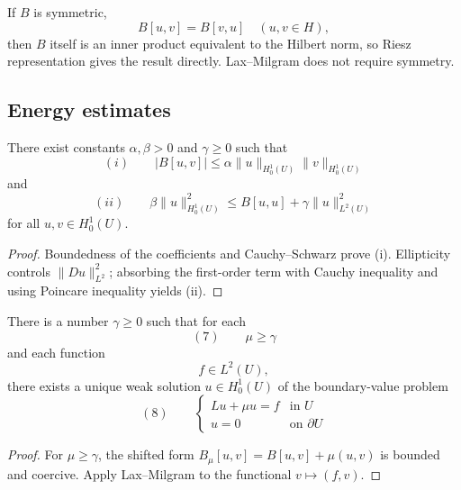 \begin{remark}
\label{rem:lax-milgram-symmetric-case}
If $B$ is symmetric,
$$B[u,v] = B[v,u] \quad (u,v \in H),$$
then $B$ itself is an inner product equivalent to the Hilbert norm, so Riesz representation gives the result directly. Lax--Milgram does not require symmetry.
\end{remark}

\subsection{Energy estimates}

\begin{theorem}
\label{thm:energy-estimates}
There exist constants $\alpha,\beta > 0$ and $\gamma \geq 0$ such that
$$(i) \qquad |B[u,v]| \leq \alpha\|u\|_{H_0^1(U)}\|v\|_{H_0^1(U)}$$
and
$$(ii) \qquad \beta\|u\|_{H_0^1(U)}^2 \leq B[u,u] + \gamma\|u\|_{L^2(U)}^2$$
for all $u,v \in H_0^1(U)$.
\end{theorem}

\begin{proof}
\sketch Boundedness of the coefficients and Cauchy--Schwarz prove (i). Ellipticity controls $\|Du\|_{L^2}^2$; absorbing the first-order term with Cauchy inequality and using Poincare inequality yields (ii).
\end{proof}

\begin{theorem}
\label{thm:first-existence-weak-solutions}
There is a number $\gamma \geq 0$ such that for each
$$(7) \qquad \mu \geq \gamma$$
and each function
$$f \in L^2(U),$$
there exists a unique weak solution $u \in H_0^1(U)$ of the boundary-value problem
$$(8) \qquad \begin{cases} Lu + \mu u = f & \text{in } U \\ u = 0 & \text{on } \partial U \end{cases}$$
\end{theorem}

\begin{proof}
\sketch For $\mu\ge\gamma$, the shifted form $B_\mu[u,v]=B[u,v]+\mu(u,v)$ is bounded and coercive. Apply Lax--Milgram to the functional $v\mapsto(f,v)$.
\end{proof}

